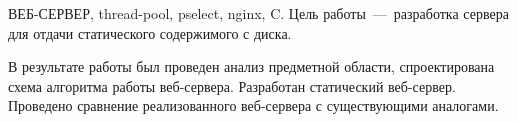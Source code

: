 \begin{essay}{ВЕБ-СЕРВЕР, thread-pool, pselect, nginx, C.}
	Цель работы~---~разработка сервера для отдачи статического содержимого с диска.
	
	В результате работы был проведен анализ предметной области, спроектирована схема алгоритма работы веб-сервера.
	Разработан статический веб-сервер.
	Проведено сравнение реализованного веб-сервера с существующими аналогами.
\end{essay}